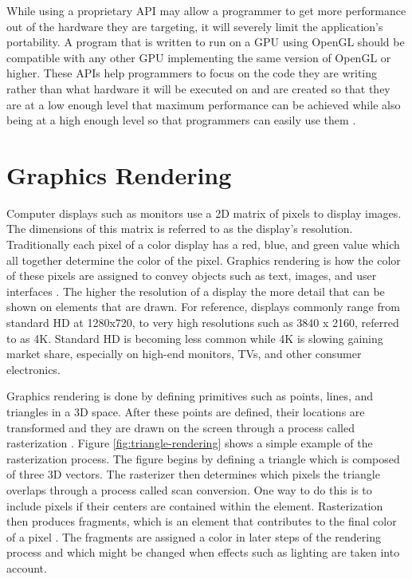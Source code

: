 \documentclass{article}
\begin{document}
While using a proprietary API may allow a programmer to get more performance out of the hardware they are targeting, it will severely limit the application's portability. A program that is written to run on a GPU using OpenGL should be compatible with any other GPU implementing the same version of OpenGL or higher. These APIs help programmers to focus on the code they are writing rather than what hardware it will be executed on and are created so that they are at a low enough level that maximum performance can be achieved while also being at a high enough level so that programmers can easily use them \cite[p.~4]{sellers2016}.

\section{Graphics Rendering}
Computer displays such as monitors use a 2D matrix of pixels to display images. The dimensions of this matrix is referred to as the display's resolution. Traditionally each pixel of a color display has a red, blue, and green value which all together determine the color of the pixel. Graphics rendering is how the color of these pixels are assigned to convey objects such as text, images, and user interfaces \cite{mckesson2018}. The higher the resolution of a display the more detail that can be shown on elements that are drawn. For reference, displays commonly range from standard HD at 1280x720, to very high resolutions such as 3840 x 2160, referred to as 4K. Standard HD is becoming less common while 4K is slowing gaining market share, especially on high-end monitors, TVs, and other consumer electronics.

Graphics rendering is done by defining primitives such as points, lines, and triangles in a 3D space. After these points are defined, their locations are transformed and they are drawn on the screen through a process called rasterization \cite{mckesson2018}. Figure \ref{fig:triangle-rendering} shows a simple example of the rasterization process. The figure begins by defining a triangle which is composed of three 3D vectors. The rasterizer then determines which pixels the triangle overlaps through a process called scan conversion. One way to do this is to include pixels if their centers are contained within the element. Rasterization then produces fragments, which is an element that contributes to the final color of a pixel \cite{sellers2016}. The fragments are assigned a color in later steps of the rendering process and which might be changed when effects such as lighting are taken into account.
\end{document}
